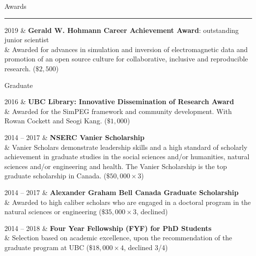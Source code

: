 \documentclass[a4paper, 11pt]{article}
\newcommand{\heading}[1]{
    \begin{minipage}[t]{\textwidth}
    \vspace{0.12cm}
    {\LARGE #1}\\
    \vspace{-0.24cm}
    \hrule
    \end{minipage}
    \vspace{0.05cm}

}
\newcommand{\subheading}[1]{
    \vspace{0.5cm}
    {\Large #1}\\
    \vspace{-0.2cm}
}
\begin{document}


\heading{Awards}

\begin{entryright}
2019 & \textbf{Gerald W. Hohmann Career Achievement Award}: outstanding junior scientist \\
& Awarded for advances in simulation and inversion of electromagnetic data and promotion of an open source culture for collaborative, inclusive and reproducible research. ($\$2,500$)
\end{entryright}

\subheading{Graduate}
\begin{entryright}
2016 & \textbf{UBC Library: Innovative Dissemination of Research Award}   \\
& Awarded for the SimPEG framework and community development. With Rowan Cockett and Seogi Kang. ($\$1,000$)
\end{entryright}

\begin{entryright}
2014 -- 2017 & \textbf{NSERC Vanier Scholarship} \\
& Vanier Scholars demonstrate leadership skills and a high standard of scholarly achievement in graduate studies in the social sciences and/or humanities, natural sciences and/or engineering and health. The Vanier Scholarship is the top graduate scholarship in Canada. ($ \$50,000 \times 3$)
\end{entryright}

\begin{entryright}
2014 -- 2017 & \textbf{Alexander Graham Bell Canada Graduate Scholarship} \\
& Awarded to high caliber scholars who are engaged in a doctoral program in the natural sciences or engineering ($ \$35,000 \times 3$, declined)
\end{entryright}

\begin{entryright}
2014 -- 2018 & \textbf{Four Year Fellowship (FYF) for PhD Students} \\
& Selection based on academic excellence, upon the recommendation of the graduate program at UBC ($\$18,000 \times 4$, declined 3/4)
\end{entryright}
\end{document}
